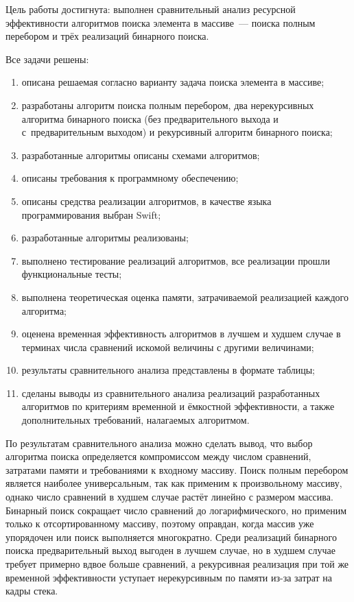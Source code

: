 
Цель работы достигнута: выполнен сравнительный анализ ресурсной эффективности
алгоритмов поиска элемента в массиве~--- поиска полным перебором и трёх
реализаций бинарного поиска.

Все задачи решены:
\begin{enumerate}
	\item описана решаемая согласно варианту задача поиска элемента в массиве;
	\item разработаны алгоритм поиска полным перебором, два нерекурсивных
	алгоритма бинарного поиска (без предварительного выхода и с~предварительным
	выходом) и рекурсивный алгоритм бинарного поиска;
	\item разработанные алгоритмы описаны схемами алгоритмов;
	\item описаны требования к программному обеспечению;
	\item описаны средства реализации алгоритмов, в качестве языка
	программирования выбран Swift;
	\item разработанные алгоритмы реализованы;
	\item выполнено тестирование реализаций алгоритмов, все реализации прошли
	функциональные тесты;
	\item выполнена теоретическая оценка памяти, затрачиваемой реализацией
	каждого алгоритма;
	\item оценена временная эффективность алгоритмов в лучшем и худшем случае
	в терминах числа сравнений искомой величины с другими величинами;
	\item результаты сравнительного анализа представлены в формате таблицы;
	\item сделаны выводы из сравнительного анализа реализаций разработанных
	алгоритмов по критериям временной и ёмкостной эффективности, а также
	дополнительных требований, налагаемых алгоритмом.
\end{enumerate}

По результатам сравнительного анализа можно сделать вывод, что выбор алгоритма
поиска определяется компромиссом между числом сравнений, затратами памяти
и требованиями к входному массиву. Поиск полным перебором является наиболее
универсальным, так как применим к произвольному массиву, однако число сравнений
в худшем случае растёт линейно с размером массива. Бинарный поиск сокращает
число сравнений до логарифмического, но применим только к отсортированному
массиву, поэтому оправдан, когда массив уже упорядочен или поиск выполняется
многократно. Среди реализаций бинарного поиска предварительный выход выгоден
в лучшем случае, но в худшем случае требует примерно вдвое больше сравнений,
а рекурсивная реализация при той же временной эффективности уступает
нерекурсивным по памяти из-за затрат на кадры стека.